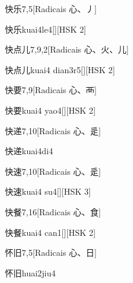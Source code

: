 \begin{entry}{快乐}{7,5}[Radicais ⼼、⼃]
  \begin{phonetics}{快乐}{kuai4le4}[][HSK 2]
  \end{phonetics}
\end{entry}

\begin{entry}{快点儿}{7,9,2}[Radicais ⼼、⽕、⼉]
  \begin{phonetics}{快点儿}{kuai4 dian3r5}[][HSK 2]
  \end{phonetics}
\end{entry}

\begin{entry}{快要}{7,9}[Radicais ⼼、⾑]
  \begin{phonetics}{快要}{kuai4 yao4}[][HSK 2]
  \end{phonetics}
\end{entry}

\begin{entry}{快递}{7,10}[Radicais ⼼、⾡]
  \begin{phonetics}{快递}{kuai4di4}
  \end{phonetics}
\end{entry}

\begin{entry}{快速}{7,10}[Radicais ⼼、⾡]
  \begin{phonetics}{快速}{kuai4 su4}[][HSK 3]
  \end{phonetics}
\end{entry}

\begin{entry}{快餐}{7,16}[Radicais ⼼、⾷]
  \begin{phonetics}{快餐}{kuai4 can1}[][HSK 2]
  \end{phonetics}
\end{entry}

\begin{entry}{怀旧}{7,5}[Radicais ⼼、⽇]
  \begin{phonetics}{怀旧}{huai2jiu4}
  \end{phonetics}
\end{entry}

